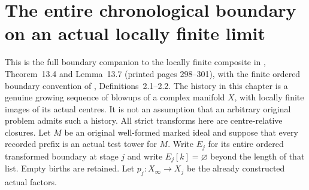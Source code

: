 \section{The entire chronological boundary on an actual locally finite limit}
\label{sec:actual-locally-finite-boundary}
This is the full boundary companion to the locally finite composite in
\cite{bierstone-milman97-invent-math}, Theorem~13.4 and Lemma~13.7
(printed pages 298--301), with the finite ordered boundary convention of
\cite{bierstone-milman08-functoriality}, Definitions~2.1--2.2.
The history in this chapter is a genuine growing sequence of blowups of a complex
manifold $X$, with locally finite images of its actual centres.  It is not an
assumption that an arbitrary original problem admits such a history.  All strict
transforms here are centre-relative closures.  Let $M$ be an original well-formed
marked ideal and suppose that every recorded prefix is an actual test tower for
$M$.  Write $E_j$ for its entire ordered transformed boundary at stage $j$ and
write $E_j[k]=\varnothing$ beyond the length of that list.  Empty births are
retained.  Let $p_j:X_\infty\to X_j$ be the already constructed actual factors.

